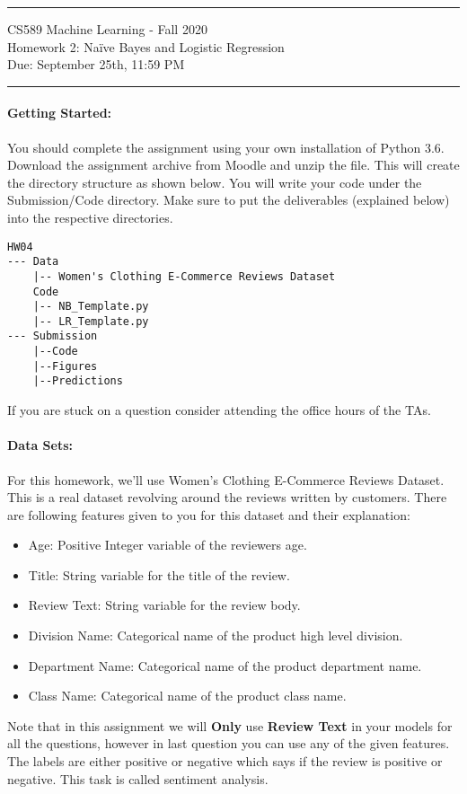 \documentclass[letterpaper]{article}
\date{Due: September 25th, 11:59 pm}
\begin{document}
{\centering
  \rule{6.3in}{2pt}
  \vspace{1em}
  {\Large
    CS589 Machine Learning - Fall 2020 \\
    Homework 2: Na\"ive Bayes and Logistic Regression \\
  }
  \vspace{1em}
  Due: September 25th, 11:59 PM \\
  \vspace{0.1em}
  \rule{6.3in}{1.5pt}
}
\vspace{1pc}


\paragraph*{Getting Started:} You should complete the assignment using your own installation of Python 3.6. Download the assignment archive from Moodle and unzip the file. This will create the directory structure as shown below. You will write your code under the Submission/Code directory. Make sure to put the deliverables (explained below) into the respective directories.

\begin{verbatim}
HW04
--- Data
    |-- Women's Clothing E-Commerce Reviews Dataset
    Code
    |-- NB_Template.py
    |-- LR_Template.py
--- Submission
    |--Code
    |--Figures    
    |--Predictions
\end{verbatim}

If you are stuck on a question consider attending the office hours of the TAs.

\paragraph*{Data Sets:} For this homework, we'll use Women's Clothing E-Commerce Reviews Dataset. This is a real dataset revolving around the reviews written by customers. There are following features given to you for this dataset and their explanation:
\begin{itemize}
\item Age: Positive Integer variable of the reviewers age.
\item Title: String variable for the title of the review.
\item Review Text: String variable for the review body.
\item Division Name: Categorical name of the product high level division.
\item Department Name: Categorical name of the product department name.
\item Class Name: Categorical name of the product class name.
\end{itemize}
Note that in this assignment we will \textbf{Only} use \textbf{Review Text} in your models for all the questions, however in last question you can use any of the given features. The labels are either positive or negative which says if the review is positive or negative. This task is called sentiment analysis. 
\vspace{12pt}
\end{document}
